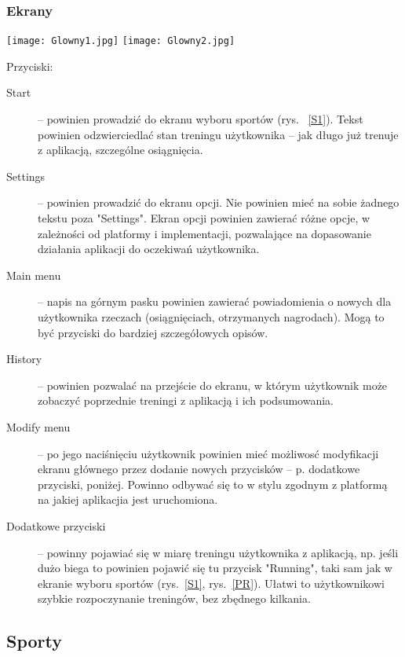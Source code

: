 \subsubsection{Ekrany}
\begin{minipage}{0.5\textwidth}
  \texttt{[image: Glowny1.jpg]}
  \label{G1}
  \texttt{[image: Glowny2.jpg]}
  \label{G2}
\end{minipage}
\begin{minipage}{0.5\textwidth}
Przyciski:\\
\begin{description}
  \item[Start] -- powinien prowadzić do ekranu wyboru sportów (rys. ~\ref{S1}). Tekst powinien odzwierciedlać stan treningu użytkownika -- jak długo już trenuje z aplikacją, szczególne osiągnięcia.
  \item[Settings] -- powinien prowadzić do ekranu opcji. Nie powinien mieć na sobie żadnego tekstu poza "Settings". Ekran opcji powinien zawierać różne opcje, w zależności od platformy i implementacji, pozwalające na dopasowanie działania aplikacji do oczekiwań użytkownika.
  \item[Main menu] -- napis na górnym pasku powinien zawierać powiadomienia o nowych dla użytkownika rzeczach (osiągnięciach, otrzymanych nagrodach). Mogą to być przyciski do bardziej szczegółowych opisów.
  \item[History] -- powinien pozwalać na przejście do ekranu, w którym użytkownik może zobaczyć poprzednie treningi z aplikacją i ich podsumowania.
  \item[Modify menu] -- po jego naciśnięciu użytkownik powinien mieć możliwosć modyfikacji ekranu głównego przez dodanie nowych przycisków -- p. dodatkowe przyciski, poniżej. Powinno odbywać się to w stylu zgodnym z platformą na jakiej aplikacjia jest uruchomiona.
  \item[Dodatkowe przyciski] -- powinny pojawiać się w miarę treningu użytkownika z aplikacją, np. jeśli dużo biega to powinien pojawić się tu przycisk "Running", taki sam jak w ekranie wyboru sportów (rys.~\ref{S1}, rys.~\ref{PR}). Ułatwi to użytkownikowi szybkie rozpoczynanie treningów, bez zbędnego kilkania.
\end{description}
\end{minipage}
\subsection{Sporty}
